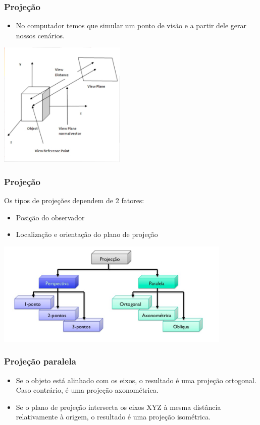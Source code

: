 \documentclass{beamer}
\begin{document}
	\begin{frame}
		\frametitle{Projeção}
		\begin{itemize}
		\item No computador temos que simular um ponto de visão e a partir dele gerar nossos cenários.
		\end{itemize}
		\begin{center}
			\includegraphics[height=6cm]{pontodevisao.png}
		\end{center}
	\end{frame}
	\begin{frame}
		\frametitle{Projeção}
		Os tipos de projeções dependem de 2 fatores:
		\begin{itemize}
		\item Posição do observador
		\item Localização e orientação do plano de projeção
		\end{itemize}
		\begin{center}
			\includegraphics[height=5cm]{fluxoproj.png}
		\end{center}
	\end{frame}
	\begin{frame}
		\frametitle{Projeção paralela}
		\begin{itemize}
		\item Se o objeto está alinhado com os eixos, o resultado é uma projeção ortogonal.\\
		Caso contrário, é uma projeção axonométrica.
		\item Se o plano de projeção intersecta os eixos XYZ à mesma distância relativamente à origem, o resultado é
uma projeção isométrica.
		\end{itemize}
	\end{frame}
\end{document}
